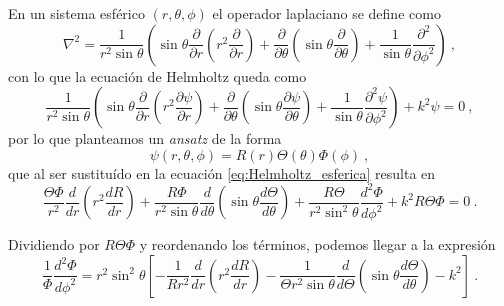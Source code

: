 En un sistema esférico $(r, \theta,\phi)$ el operador laplaciano se define como
\begin{equation}
    \nabla^2 = \frac{1}{r^2 \sin\theta} \left( \sin\theta \frac{\partial}{\partial r}\left( r^2 \frac{\partial}{\partial r} \right) + \frac{\partial}{\partial \theta} \left( \sin\theta \frac{\partial}{\partial \theta} \right) + \frac{1}{\sin\theta} \frac{\partial^2}{\partial \phi^2} \right) \ ,
\end{equation}
con lo que la ecuación de Helmholtz queda como
\begin{equation} \label{eq:Helmholtz_esferica}
    \frac{1}{r^2 \sin\theta} \left( \sin\theta \frac{\partial}{\partial r}\left( r^2 \frac{\partial \psi}{\partial r} \right) + \frac{\partial}{\partial \theta} \left( \sin\theta \frac{\partial \psi}{\partial \theta} \right) + \frac{1}{\sin\theta} \frac{\partial^2 \psi}{\partial \phi^2} \right) + k^2\psi = 0 \ ,
\end{equation}
por lo que planteamos un \emph{ansatz} de la forma
\begin{equation}
    \psi(r,\theta, \phi) = R(r) \Theta(\theta) \Phi(\phi) \ ,
\end{equation}
que al ser sustituído en la ecuación \eqref{eq:Helmholtz_esferica} resulta en
\begin{equation}
    \frac{\Theta \Phi}{r^2} \frac{d}{dr}\left( r^2 \frac{dR}{dr} \right) + \frac{R\Phi}{r^2\sin\theta} \frac{d}{d \theta} \left( \sin\theta \frac{d\Theta}{d \theta} \right) + \frac{R\Theta}{r^2\sin^2\theta} \frac{d^2\Phi}{d \phi^2} + k^2 R \Theta \Phi = 0 \ .
\end{equation}

Dividiendo por $R\Theta\Phi$ y reordenando los términos, podemos llegar a la expresión
\begin{equation}
    \frac{1}{\Phi} \frac{d^2\Phi}{d\phi^2} = r^2\sin^2\theta \left[ -\frac{1}{Rr^2} \frac{d}{dr}\left( r^2 \frac{dR}{dr} \right) - \frac{1}{\Theta r^2\sin\theta} \frac{d}{d\Theta} \left( \sin\theta \frac{d\Theta}{d\theta} \right) - k^2 \right] \ .
\end{equation}


